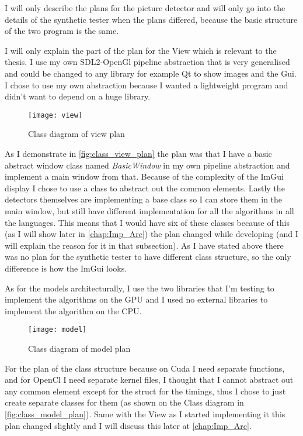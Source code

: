 I will only describe the plans for the picture detector and will only go into the details of the synthetic tester when the plans differed, because the basic structure of the two program is the same.

I will only explain the part of the plan for the View which is relevant to the thesis. I use my own \ac{SDL2}-OpenGl pipeline abstraction that is very generalised and could be changed to any library for example Qt to show images and the Gui. I chose to use my own abstraction because I wanted a lightweight program and didn't want to depend on a huge library. 

\begin{figure}[H]
\centering
\texttt{[image: view]}
\caption{Class diagram of view plan}
\label{fig:class_view_plan}
\end{figure}

As I demonstrate in \autoref{fig:class_view_plan} the plan was that I have a basic abstract window class named \textit{BasicWindow} in my own pipeline abstraction and implement a main window from that. Because of the complexity of the ImGui display I chose to use a class to abstract out the common elements. Lastly the detectors themselves are implementing a base class so I can store them in the main window, but still have different implementation for all the algorithms in all the languages. This means that I would have six of these classes because of this (as I will show later in \autoref{chap:Imp_Arc}) the plan changed while developing (and I will explain the reason for it in that subsection). As I have stated above there was no plan for the synthetic tester to have different class structure, so the only difference is how the ImGui looks.

As for the models architecturally, I use the two libraries that I'm testing to implement the algorithms on the \ac{GPU} and I used no external libraries to implement the algorithm on the \ac{CPU}.

\begin{figure}[H]
\centering
\texttt{[image: model]}
\caption{Class diagram of model plan}
\label{fig:class_model_plan}
\end{figure}

For the plan of the class structure because on Cuda I need separate functions, and for OpenCl I need separate kernel files, I thought that I cannot abstract out any common element except for the struct for the timings, thus I chose to just create separate classes for them (as shown on the Class diagram in \autoref{fig:class_model_plan}). Same with the View as I started implementing it this plan changed slightly and I will discuss this later at \autoref{chap:Imp_Arc}.


